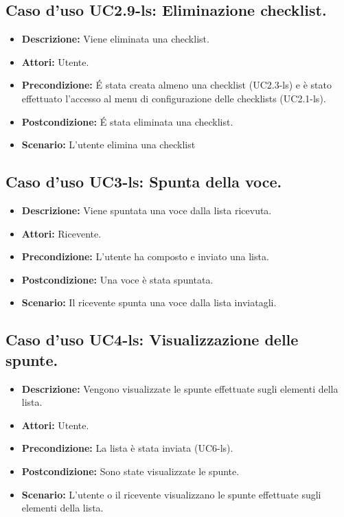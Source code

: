 \subsection{Caso d'uso UC2.9-ls: Eliminazione checklist.}
\begin{itemize}
\item[]\textbf{Descrizione:} Viene eliminata una checklist.
\item[]\textbf{Attori:} Utente. 
\item[]\textbf{Precondizione:} \'E stata creata almeno una checklist (UC2.3-ls) e è stato effettuato l'accesso al menu di configurazione delle checklists (UC2.1-ls). 
\item[]\textbf{Postcondizione:} \'E stata eliminata una checklist. 
\item[]\textbf{Scenario:}
L'utente elimina una checklist 
\end{itemize}

\subsection{Caso d'uso UC3-ls: Spunta della voce.}
\begin{itemize}
\item[]\textbf{Descrizione:} Viene spuntata una voce dalla lista ricevuta.
\item[]\textbf{Attori:} Ricevente. 
\item[]\textbf{Precondizione:} L'utente ha composto e inviato una lista. 
\item[]\textbf{Postcondizione:} Una voce è stata spuntata. 
\item[]\textbf{Scenario:}
Il ricevente spunta una voce dalla lista inviatagli. 
\end{itemize}

\subsection{Caso d'uso UC4-ls: Visualizzazione delle spunte.}
\begin{itemize}
\item[]\textbf{Descrizione:} Vengono visualizzate le spunte effettuate sugli elementi della lista.
\item[]\textbf{Attori:} Utente. 
\item[]\textbf{Precondizione:} La lista è stata inviata (UC6-ls). 
\item[]\textbf{Postcondizione:} Sono state visualizzate le spunte. 
\item[]\textbf{Scenario:}
L'utente o il ricevente visualizzano le spunte effettuate sugli elementi della lista. 
\end{itemize}

